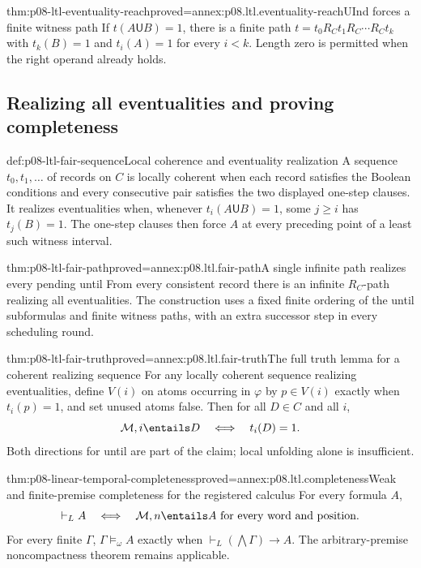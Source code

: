 \begin{hblemma}{thm:p08-ltl-eventuality-reach}{proved=annex:p08.ltl.eventuality-reach}{UInd forces a finite witness path}
If \(t(A\mathbin{\mathsf U}B)=1\), there is a finite path
\(t=t_0R_Ct_1R_C\cdots R_Ct_k\) with
\(t_k(B)=1\) and \(t_i(A)=1\) for every \(i<k\).
Length zero is permitted when the right operand already holds.
\end{hblemma}

\subsection{Realizing all eventualities and proving completeness}
\label{sec:p08-ltl-fair-truth}

\begin{hbdefinition}{def:p08-ltl-fair-sequence}{Local coherence and eventuality realization}
A sequence \(t_0,t_1,\ldots\) of records on \(C\) is locally
coherent when each record satisfies the Boolean conditions and
every consecutive pair satisfies the two displayed one-step clauses.
It realizes eventualities when, whenever
\(t_i(A\mathbin{\mathsf U}B)=1\), some \(j\geq i\) has
\(t_j(B)=1\). The one-step clauses then force \(A\) at every
preceding point of a least such witness interval.
\end{hbdefinition}

\begin{hblemma}{thm:p08-ltl-fair-path}{proved=annex:p08.ltl.fair-path}{A single infinite path realizes every pending until}
From every consistent record there is an infinite \(R_C\)-path
realizing all eventualities. The construction uses a fixed finite
ordering of the until subformulas and finite witness paths, with
an extra successor step in every scheduling round.
\end{hblemma}

\begin{hblemma}{thm:p08-ltl-fair-truth}{proved=annex:p08.ltl.fair-truth}{The full truth lemma for a coherent realizing sequence}
For any locally coherent sequence realizing eventualities, define
\(V(i)\) on atoms occurring in \(\varphi\) by
\(p\in V(i)\) exactly when \(t_i(p)=1\), and set unused atoms
false. Then for all \(D\in C\) and all \(i\),
\[
 \mathcal M,i\entails D\quad\Longleftrightarrow\quad t_i(D)=1.
\]
Both directions for until are part of the claim; local unfolding
alone is insufficient.
\end{hblemma}

\begin{hbtheorem}{thm:p08-linear-temporal-completeness}{proved=annex:p08.ltl.completeness}{Weak and finite-premise completeness for the registered calculus}
For every formula \(A\),
\[
 \vdash_L A\quad\Longleftrightarrow\quad
 \mathcal M,n\entails A\text{ for every word and position}.
\]
For every finite \(\Gamma\),
\(\Gamma\models_\omega A\) exactly when
\(\vdash_L(\bigwedge\Gamma)\to A\).
The arbitrary-premise noncompactness theorem remains applicable.
\end{hbtheorem}

